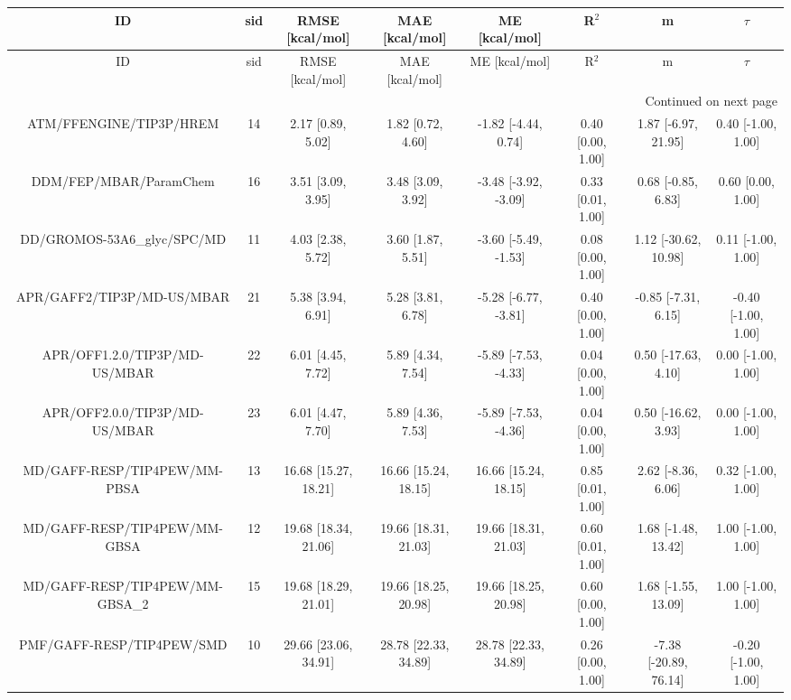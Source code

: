 \documentclass[8pt]{article}
\begin{document}
\begin{center}
\begin{footnotesize}
\begin{longtable}{|cccccccc|}
\toprule
                             ID & sid &      RMSE [kcal/mol] &       MAE [kcal/mol] &        ME [kcal/mol] &             R$^2$ &                     m &              $\tau$ \\
\midrule
\endfirsthead

\toprule
                             ID & sid &      RMSE [kcal/mol] &       MAE [kcal/mol] &        ME [kcal/mol] &             R$^2$ &                     m &              $\tau$ \\
\midrule
\endhead
\midrule
\multicolumn{8}{r}{{Continued on next page}} \\
\midrule
\endfoot

\bottomrule
\endlastfoot
        ATM/FFENGINE/TIP3P/HREM &  14 &    2.17 [0.89, 5.02] &    1.82 [0.72, 4.60] &  -1.82 [-4.44, 0.74] & 0.40 [0.00, 1.00] &   1.87 [-6.97, 21.95] &  0.40 [-1.00, 1.00] \\
         DDM/FEP/MBAR/ParamChem &  16 &    3.51 [3.09, 3.95] &    3.48 [3.09, 3.92] & -3.48 [-3.92, -3.09] & 0.33 [0.01, 1.00] &    0.68 [-0.85, 6.83] &   0.60 [0.00, 1.00] \\
    DD/GROMOS-53A6\_glyc/SPC/MD &  11 &    4.03 [2.38, 5.72] &    3.60 [1.87, 5.51] & -3.60 [-5.49, -1.53] & 0.08 [0.00, 1.00] &  1.12 [-30.62, 10.98] &  0.11 [-1.00, 1.00] \\
     APR/GAFF2/TIP3P/MD-US/MBAR &  21 &    5.38 [3.94, 6.91] &    5.28 [3.81, 6.78] & -5.28 [-6.77, -3.81] & 0.40 [0.00, 1.00] &   -0.85 [-7.31, 6.15] & -0.40 [-1.00, 1.00] \\
  APR/OFF1.2.0/TIP3P/MD-US/MBAR &  22 &    6.01 [4.45, 7.72] &    5.89 [4.34, 7.54] & -5.89 [-7.53, -4.33] & 0.04 [0.00, 1.00] &   0.50 [-17.63, 4.10] &  0.00 [-1.00, 1.00] \\
  APR/OFF2.0.0/TIP3P/MD-US/MBAR &  23 &    6.01 [4.47, 7.70] &    5.89 [4.36, 7.53] & -5.89 [-7.53, -4.36] & 0.04 [0.00, 1.00] &   0.50 [-16.62, 3.93] &  0.00 [-1.00, 1.00] \\
   MD/GAFF-RESP/TIP4PEW/MM-PBSA &  13 & 16.68 [15.27, 18.21] & 16.66 [15.24, 18.15] & 16.66 [15.24, 18.15] & 0.85 [0.01, 1.00] &    2.62 [-8.36, 6.06] &  0.32 [-1.00, 1.00] \\
   MD/GAFF-RESP/TIP4PEW/MM-GBSA &  12 & 19.68 [18.34, 21.06] & 19.66 [18.31, 21.03] & 19.66 [18.31, 21.03] & 0.60 [0.01, 1.00] &   1.68 [-1.48, 13.42] &  1.00 [-1.00, 1.00] \\
MD/GAFF-RESP/TIP4PEW/MM-GBSA\_2 &  15 & 19.68 [18.29, 21.01] & 19.66 [18.25, 20.98] & 19.66 [18.25, 20.98] & 0.60 [0.00, 1.00] &   1.68 [-1.55, 13.09] &  1.00 [-1.00, 1.00] \\
      PMF/GAFF-RESP/TIP4PEW/SMD &  10 & 29.66 [23.06, 34.91] & 28.78 [22.33, 34.89] & 28.78 [22.33, 34.89] & 0.26 [0.00, 1.00] & -7.38 [-20.89, 76.14] & -0.20 [-1.00, 1.00] \\
\end{longtable}
\end{footnotesize}
\end{center}
\end{document}
